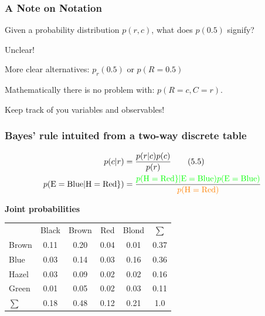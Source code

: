 \documentclass[usenames,dvipsnames,table]{beamer}
\newcommand{\cgy}{\cellcolor{gray!25}}
\newcommand{\cgr}{\cellcolor{green!25}}
\newcommand{\cye}{\cellcolor{orange!25}}
\begin{document}
\begin{frame}
\frametitle{A Note on Notation}
Given a probability distribution $p(r, c)$, what does $p(0.5)$ signify?

\vspace{1em}
Unclear!

\vspace{1em}
More clear alternatives: $p_r(0.5)$ or $p(R=0.5)$

\vspace{1em}
Mathematically there is no problem with: $p(R=c, C=r)$.

Keep track of you variables and observables!

\end{frame}

\begin{frame}
\frametitle{Bayes' rule intuited from a two-way discrete table}

\begin{align*}
p(c\vert r)  &= \frac{p(r\vert c) p(c)}{p(r)} \tag{5.5} \\
p(\mathrm{E}= \mathrm{Blue}|\mathrm{H}=\mathrm{Red}\})
&= \frac{\textcolor{green}{p(\mathrm{H}=\mathrm{Red}\}
                             |\textcolor{green}{\mathrm{E}=\mathrm{Blue}})
                             p(\mathrm{E}=\mathrm{Blue})}}
       {\textcolor{orange}{p(\mathrm{H}=\mathrm{Red})}}
\end{align*}

\textbf{Joint probabilities}
\begin{table}
\begin{tabular}{lccccc}
           & Black & Brown & Red  & Blond & $\sum$ \\
     Brown &\cgy0.11&\cgy0.20&\cye0.04&\cgy0.01& 0.37 \\
      Blue &\cgy0.03&\cgy0.14&\cgr0.03&\cgy0.16& 0.36 \\
     Hazel &\cgy0.03&\cgy0.09&\cye0.02&\cgy0.02& 0.16 \\
     Green &\cgy0.01&\cgy0.05&\cye0.02&\cgy0.03& 0.11 \\
    $\sum$ &  0.18 &  0.48 & 0.12 &  0.21 & 1.0   \\
\end{tabular}
\end{table}
\end{frame}
\end{document}
